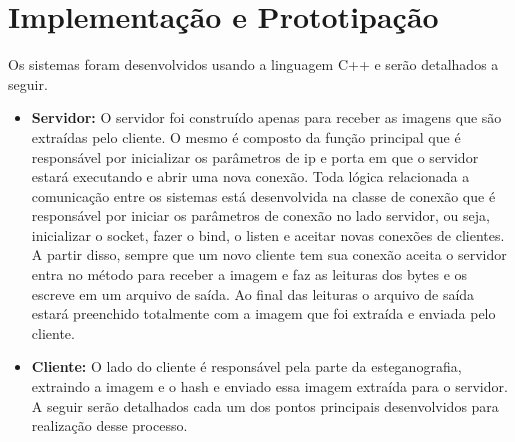 \documentclass[journal,transmag]{IEEEtran}
\begin{document}
\section{Implementação e Prototipação}

Os sistemas foram desenvolvidos usando a linguagem C++ e serão detalhados a seguir.

\begin{itemize}
	\item \textbf{Servidor:} O servidor foi construído apenas para receber as imagens que são extraídas pelo cliente. O mesmo é composto da função principal que é responsável por inicializar os parâmetros de ip e porta em que o servidor estará executando e abrir uma nova conexão. Toda lógica relacionada a comunicação entre os sistemas está desenvolvida na classe de conexão que é responsável por iniciar os parâmetros de conexão no lado servidor, ou seja, inicializar o socket, fazer o bind, o listen e aceitar novas conexões de clientes. A partir disso, sempre que um novo cliente tem sua conexão aceita o servidor entra no método para receber a imagem e faz as leituras dos bytes e os escreve em um arquivo de saída. Ao final das leituras o arquivo de saída estará preenchido totalmente com a imagem que foi extraída e enviada pelo cliente.

	\item \textbf{Cliente:} O lado do cliente é responsável pela parte da esteganografia, extraindo a imagem e o hash e enviado essa imagem extraída para o servidor. A seguir serão detalhados cada um dos pontos principais desenvolvidos para realização desse processo.


\end{itemize}
\end{document}
